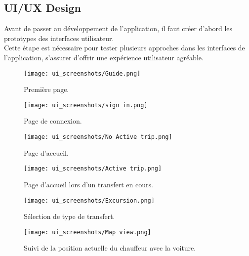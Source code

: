 \subsection{UI/UX Design}
Avant de passer au développement de l'application, il faut créer d'abord les prototypes des interfaces utilisateur. \\
\noindent Cette étape est nécessaire pour tester plusieurs approches dans les interfaces de l'application, s'assurer d'offrir une expérience utilisateur agréable. \\
\vspace{1cm}
\begin{multicols}{2}
    \begin{figure}[H]
        \centering
        \texttt{[image: ui\_screenshots/Guide.png]}
        \vspace{1cm}
        \caption{Première page.}
        \label{fig:start_page}
    \end{figure}
    \begin{figure}[H]
        \centering
        \texttt{[image: ui\_screenshots/sign in.png]}
        \vspace{1cm}
        \caption{Page de connexion.}
        \label{fig:sign_in_page}
    \end{figure}
\end{multicols}
\newpage
\begin{multicols}{2}
    \begin{figure}[H]
        \centering
        \texttt{[image: ui\_screenshots/No Active trip.png]}
        \vspace{1cm}
        \caption{\centering Page d'accueil.}
        \label{fig:no_active_trip}
    \end{figure}
    \begin{figure}[H]
        \centering
        \texttt{[image: ui\_screenshots/Active trip.png]}
        \vspace{1cm}
        \caption{\centering Page d'accueil lors d'un transfert en cours.}
        \label{fig:active_trip}
    \end{figure}
\end{multicols}
\begin{multicols}{2}
    \begin{figure}[H]
        \centering
        \texttt{[image: ui\_screenshots/Excursion.png]}
        \vspace{1cm}
        \caption{\centering Sélection de type de transfert.}
        \label{fig:trip_select}
    \end{figure}
    \begin{figure}[H]
        \centering
        \texttt{[image: ui\_screenshots/Map view.png]}
        \vspace{1cm}
        \caption{\centering Suivi de la position actuelle du chauffeur avec la voiture.}
        \label{fig:follow_driver}
    \end{figure}
\end{multicols}
